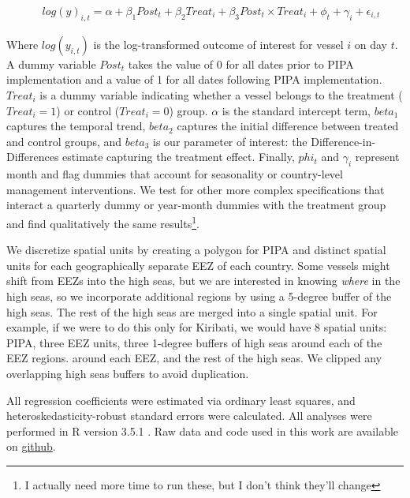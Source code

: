 \documentclass[9p,twocolumn,twoside,lineno]{pnas-new}
\begin{document}
\begin{figure}[h]
\begin{align*}
log(y)_{i,t} = \alpha + \beta_1 Post_t + \beta_2 Treat_i + \beta_3 Post_t \times Treat_i + \phi_t + \gamma_i + \epsilon_{i,t}
\label{eqn:did}
\end{align*}
\end{figure}

Where $log(y_{i,t})$ is the log-transformed outcome of interest for vessel $i$ on day $t$. A dummy variable $Post_t$ takes the value of 0 for all dates prior to PIPA implementation and a value of 1 for all dates following PIPA implementation. $Treat_i$ is a dummy variable indicating whether a vessel belongs to the treatment ($Treat_i = 1$) or control ($Treat_i = 0$) group. $\alpha$ is the standard intercept term, $beta_1$ captures the temporal trend, $beta_2$ captures the initial difference between treated and control groups, and $beta_3$ is our parameter of interest: the Difference-in-Differences estimate capturing the treatment effect. Finally, $phi_t$ and $\gamma_i$ represent month and flag dummies that account for seasonality or country-level management interventions. We test for other more complex specifications that interact a quarterly dummy or year-month dummies with the treatment group and find qualitatively the same results\footnote{I actually need more time to run these, but I don't think they'll change}.


We discretize spatial units by creating a polygon for PIPA and distinct spatial units for each geographically separate EEZ of each country. Some vessels might shift from EEZs into the high seas, but we are interested in knowing \emph{where} in the high seas, so we incorporate additional regions by using a 5-degree buffer of the high seas. The rest of the high seas are merged into a single spatial unit. For example, if we were to do this only for Kiribati, we would have 8 spatial units: PIPA, three EEZ units, three 1-degree buffers of high seas  around each of the EEZ regions. around each EEZ, and the rest of the high seas. We clipped any overlapping high seas buffers to avoid duplication.

All regression coefficients were estimated via ordinary least squares, and heteroskedasticity-robust standard errors were calculated. All analyses were performed in R version 3.5.1 \citep{rcore_2018}. Raw data and code used in this work are available on \href{https://github.com/jcvdav/MPA_displacement}{github}.

\clearpage
\end{document}
